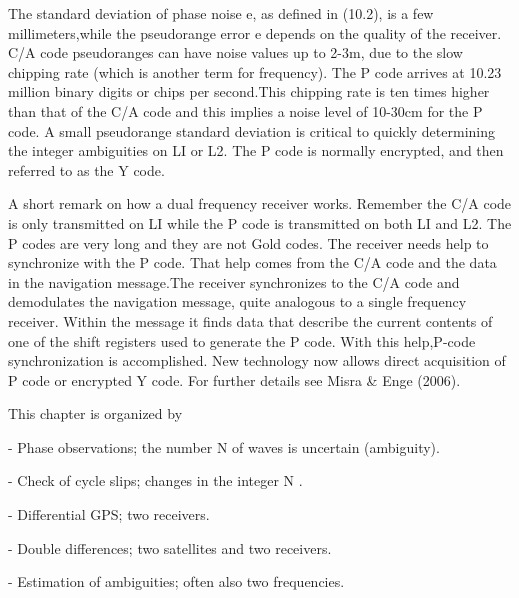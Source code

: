 The standard deviation of phase noise e, as defined in (10.2), is a few millimeters,while the pseudorange error e depends on the quality of the receiver. C/A code pseudoranges can have noise values up to 2-3m, due to the slow chipping rate (which is another term for frequency). The P code arrives at 10.23 million binary digits or chips per second.This chipping rate is ten times higher than that of the C/A code and this implies a noise level of 10-30cm for the P code. A small pseudorange standard deviation is critical to quickly determining the integer ambiguities on LI or L2. The P code is normally encrypted, and then referred to as the Y code.

A short remark on how a dual frequency receiver works. Remember the C/A code is only transmitted on LI while the P code is transmitted on both LI and L2. The P codes are very long and they are not Gold codes. The receiver needs help to synchronize with the P code. That help comes from the C/A code and the data in the navigation message.The receiver synchronizes to the C/A code and demodulates the navigation message, quite analogous to a single frequency receiver. Within the message it finds data that describe the current contents of one of the shift registers used to generate the P code. With this help,P-code synchronization is accomplished. New technology now allows direct acquisition of P code or encrypted Y code. For further details see Misra \& Enge (2006).

This chapter is organized by

- Phase observations; the number N of waves is uncertain (ambiguity).

- Check of cycle slips; changes in the integer N .

- Differential GPS; two receivers.

- Double differences; two satellites and two receivers.

- Estimation of ambiguities; often also two frequencies.